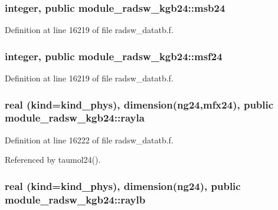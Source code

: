\subsubsection[{\texorpdfstring{msb24}{msb24}}]{\setlength{\rightskip}{0pt plus 5cm}integer, public module\+\_\+radsw\+\_\+kgb24\+::msb24}\hypertarget{namespacemodule__radsw__kgb24_a0ec09b4df9fbfa868844ad93a84cbe31}{}\label{namespacemodule__radsw__kgb24_a0ec09b4df9fbfa868844ad93a84cbe31}


Definition at line 16219 of file radsw\+\_\+datatb.\+f.

\subsubsection[{\texorpdfstring{msf24}{msf24}}]{\setlength{\rightskip}{0pt plus 5cm}integer, public module\+\_\+radsw\+\_\+kgb24\+::msf24}\hypertarget{namespacemodule__radsw__kgb24_a52d0fde0af1d5427acf0d1924f393cdc}{}\label{namespacemodule__radsw__kgb24_a52d0fde0af1d5427acf0d1924f393cdc}


Definition at line 16219 of file radsw\+\_\+datatb.\+f.

\subsubsection[{\texorpdfstring{rayla}{rayla}}]{\setlength{\rightskip}{0pt plus 5cm}real (kind=kind\+\_\+phys), dimension(ng24,{\bf mfx24}), public module\+\_\+radsw\+\_\+kgb24\+::rayla}\hypertarget{namespacemodule__radsw__kgb24_ab24774576414b5d210c34916c3d19404}{}\label{namespacemodule__radsw__kgb24_ab24774576414b5d210c34916c3d19404}


Definition at line 16222 of file radsw\+\_\+datatb.\+f.



Referenced by taumol24().

\subsubsection[{\texorpdfstring{raylb}{raylb}}]{\setlength{\rightskip}{0pt plus 5cm}real (kind=kind\+\_\+phys), dimension(ng24), public module\+\_\+radsw\+\_\+kgb24\+::raylb}\hypertarget{namespacemodule__radsw__kgb24_a927fc4a43727d3e0735448c1cdc60458}{}\label{namespacemodule__radsw__kgb24_a927fc4a43727d3e0735448c1cdc60458}


